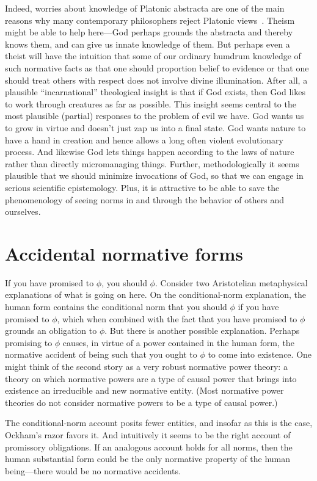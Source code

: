 Indeed, worries about knowledge of Platonic abstracta are one of the main reasons why many contemporary
philosophers reject Platonic views~\parencite{FieldRealism}. Theism might be able to help here---God perhaps
grounds the abstracta and thereby knows them, and can give us innate knowledge of them. But perhaps
even a theist will have the intuition that some of our ordinary humdrum knowledge of such normative
facts as that one should proportion belief to evidence or that one should treat others with respect 
does not involve divine illumination. 
After all, a plausible ``incarnational'' theological insight is that if God exists, then God likes to work through creatures
as far as possible. This insight seems central to the most plausible (partial) responses to the
problem of evil we have. God wants us to grow in virtue and doesn't just zap us into a final state.
God wants nature to have a hand in creation and hence allows a long often violent evolutionary process.
And likewise God lets things happen according to the laws of nature rather than directly micromanaging things.
Further, methodologically it seems plausible that we should minimize invocations of God, so that we can engage
in serious scientific epistemology. Plus, it is
attractive to be able to save the phenomenology of seeing norms in and through the behavior of others and ourselves.

\section{Accidental normative forms}
If you have promised to $\phi$, you should $\phi$. Consider two Aristotelian metaphysical explanations of what is going on here.
On the conditional-norm explanation, the human form contains the conditional norm that you should $\phi$ if you have promised 
to $\phi$, which when combined with the fact that you have promised to $\phi$ grounds an obligation to $\phi$. But there is
another possible explanation. Perhaps promising to $\phi$ causes, in virtue of a power contained in the human form, 
the normative accident of being such that you ought to $\phi$ to come into existence. One might think of the second story as 
a very robust normative power theory: a theory on which normative powers are a type of causal power that brings into existence
an irreducible and new normative entity. (Most normative power theories do not consider normative powers to be a type of 
causal power.) 

The conditional-norm account posits fewer entities, and insofar as this is the case, Ockham's razor favors it. And intuitively
it seems to be the right account of promissory obligations. If an analogous account holds for all norms, then the human substantial form could be 
the only normative property of the human being---there would be no normative accidents.

